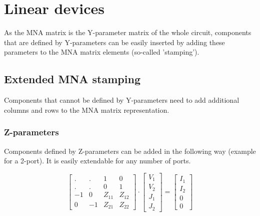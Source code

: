 %
%
%
%


\chapter{Linear devices}
\label{sec:Ldevices}

As the MNA matrix is the Y-parameter matrix of the whole circuit,
components that are defined by Y-parameters can be easily inserted by
adding these parameters to the MNA matrix elements (so-called
'stamping').

\section{Extended MNA stamping}

Components that cannot be defined by Y-parameters need to add
additional columns and rows to the MNA matrix representation.

\subsection{Z-parameters}

Components defined by Z-parameters can be added in the following way
(example for a 2-port). It is easily extendable for any number of
ports.

\begin{equation}
\begin{bmatrix}
 . & .  &  1 & 0\\
 . & .  &  0 & 1\\
-1 &  0 & Z_{11} & Z_{12}\\
 0 & -1 & Z_{21} & Z_{22}
\end{bmatrix}
\cdot
\begin{bmatrix}
V_{1}\\
V_{2}\\
J_{1}\\
J_{2}
\end{bmatrix}
=
\begin{bmatrix}
I_{1}\\
I_{2}\\
0\\
0
\end{bmatrix}
\end{equation}

